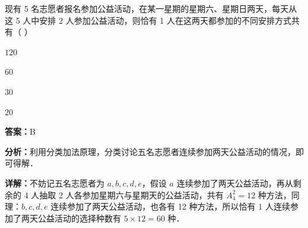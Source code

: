 \begin{question}[points=5]
现有 5 名志愿者报名参加公益活动，在某一星期的星期六、星期日两天，每天从这 5 人中安排 2 人参加公益活动，则恰有 1 人在这两天都参加的不同安排方式共有（                                    ）
\begin{choices}
  \item $120$
  \item $60$
  \item $30$
  \item $20$
\end{choices}
\begin{solution}
\textbf{答案：}B

\textbf{分析：}利用分类加法原理，分类讨论五名志愿者连续参加两天公益活动的情况，即可得解．

\textbf{详解：}不妨记五名志愿者为 $a,b,c,d,e$，假设 $a$ 连续参加了两天公益活动，再从剩余的 4 人抽取 2 人各参加星期六与星期天的公益活动，共有 $A_4^2 = 12$ 种方法，同理：$b,c,d,e$ 连续参加了两天公益活动，也各有 12 种方法，所以恰有 1 人连续参加了两天公益活动的选择种数有 $5\times 12 = 60$ 种．
\end{solution}
\end{question}

